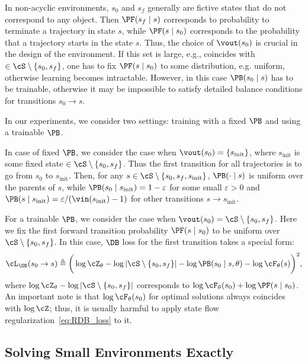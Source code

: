 In non-acyclic environments, $s_0$ and $s_f$ generally are fictive states that do not correspond to any object. Then $\PF(s_f \mid s)$ corresponds to probability to terminate a trajectory in state $s$, while $\PF(s \mid s_0)$ corresponds to the probability that a trajectory starts in the state $s$. Thus, the choice of $\vout(s_0)$ is crucial in the design of the environment. If this set is large, e.g., coincides with $\in \cS \setminus \{s_0, s_f\}$, one has to fix $\PF(s \mid s_0)$ to some distribution, e.g. uniform, otherwise learning becomes intractable. However, in this case $\PB(s_0 \mid s)$ has to be trainable, otherwise it may be impossible to satisfy detailed balance conditions for transitions $s_0 \to s$.


In our experiments, we consider two settings: training with a fixed $\PB$ and using a trainable $\PB$. 

In case of fixed $\PB$, we consider the case when $\vout(s_0) = \{ s_{\text{init}} \}$, where $s_{\text{init}}$ is some fixed state $\in \cS \setminus \{s_0, s_f\}$. Thus the first transition for all trajectories is to go from $s_0$ to $s_{\text{init}}$. Then, for any $s \in \cS \setminus \{s_0, s_f, s_{\text{init}}\}$, $\PB(\cdot \mid s)$ is uniform over the parents of $s$, while $\PB(s_0 \mid s_{\text{init}}) = 1 - \varepsilon$ for some small $\varepsilon > 0$ and $\PB(s \mid s_{\text{init}}) = \varepsilon / (\vin(s_{\text{init}}) - 1)$ for other transitions $s \to s_{\text{init}}$.



For a trainable $\PB$, we consider the case when $\vout(s_0) = \cS \setminus \{s_0, s_f\}$. Here we fix the first forward transition probability $\PF(s \mid s_0)$ to be uniform over $\cS \setminus \{s_0, s_f\}$. In this case, $\DB$ loss for the first transition takes a special form:
\begin{equation}\label{eq:first_db}
{\cL_{\DB}(s_0 \to s) \triangleq \bigg(\log \cZ_{\theta} - \log | \cS \setminus \{s_0, s_f\}| - \log \PB(s_0 \mid s, \theta) - \log \cF_{\theta}(s)  \bigg)^2, }
\end{equation}
where $\log \cZ_{\theta} - \log | \cS \setminus \{s_0, s_f\}|$ corresponds to $\log \cF_\theta(s_0) + \log \PF(s \mid s_0)$. An important note is that $\log \cF_\theta(s_0)$ for optimal solutions always coincides with $\log \cZ$; thus, it is usually harmful to apply state flow regularization~\eqref{eq:RDB_loss} to it.

\subsection{Solving Small Environments Exactly}\label{app:small_env_solution}

